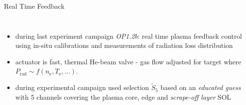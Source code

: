 \documentclass[final]{beamer}
\newcommand{\ix}[1]{_\text{#1}}
\newcommand{\tilt}[1]{\textit{#1}}
\begin{document}
\begin{frame}
\begin{minipage}[t]{0.39\textwidth}
    \end{minipage}%
    \hfill%
    \begin{minipage}[t]{0.6\textwidth}%
        \vfill%
        \begin{kasten}{Real Time Feedback}%
            \begin{columns}%
                \small{%
                    \begin{itemize}%
                        \item{%
                            during last experiment campaign \tilt{OP1.2b}: %
                            real time plasma feedback control using %
                            in-situ calibrations %
                            and measurements of radiation loss distribution}%
                        \item{%
                            actuator is fast, thermal He-beam valve - %
                            gas flow adjusted for target %
                            where $P\ix{rad}\sim f(n\ix{e}, T\ix{e}, \dots)$.}%
                        \item{%
                            during experimental campaign used %
                            selection $\widetilde{S}_{5}$ based on an %
                            \tilt{educated guess} with 5 channels covering %
                            the plasma core, edge and %
                            \tilt{scrape-off layer} SOL}%
                    \end{itemize}}%
                    \vspace*{0.25cm}%


\end{columns}
\end{kasten}
\end{minipage}
\end{frame}
\end{document}
